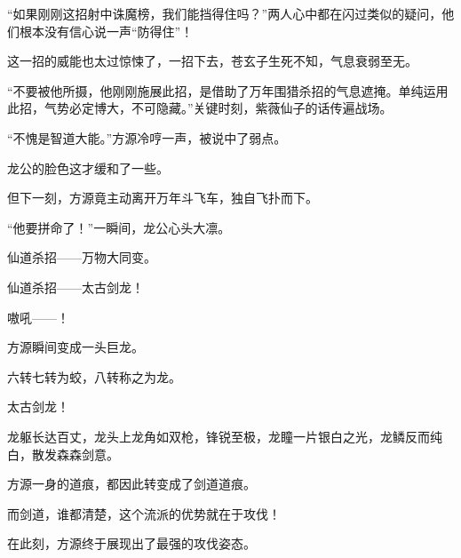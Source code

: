 \begin{this_body}
“如果刚刚这招射中诛魔榜，我们能挡得住吗？”两人心中都在闪过类似的疑问，他们根本没有信心说一声“防得住”！

这一招的威能也太过惊悚了，一招下去，苍玄子生死不知，气息衰弱至无。

“不要被他所摄，他刚刚施展此招，是借助了万年围猎杀招的气息遮掩。单纯运用此招，气势必定博大，不可隐藏。”关键时刻，紫薇仙子的话传遍战场。

“不愧是智道大能。”方源冷哼一声，被说中了弱点。

龙公的脸色这才缓和了一些。

但下一刻，方源竟主动离开万年斗飞车，独自飞扑而下。

“他要拼命了！”一瞬间，龙公心头大凛。

仙道杀招——万物大同变。

仙道杀招——太古剑龙！

嗷吼——！

方源瞬间变成一头巨龙。

六转七转为蛟，八转称之为龙。

太古剑龙！

龙躯长达百丈，龙头上龙角如双枪，锋锐至极，龙瞳一片银白之光，龙鳞反而纯白，散发森森剑意。

方源一身的道痕，都因此转变成了剑道道痕。

而剑道，谁都清楚，这个流派的优势就在于攻伐！

在此刻，方源终于展现出了最强的攻伐姿态。

\end{this_body}

